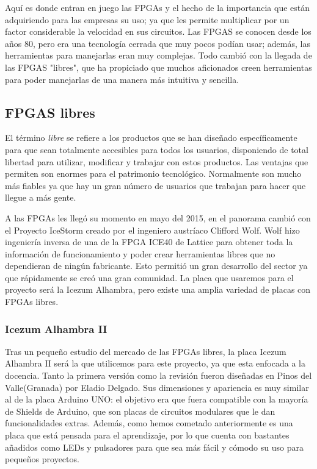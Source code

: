 Aquí es donde entran en juego las FPGAs y el hecho de la importancia que están adquiriendo para las empresas su uso; ya que les permite multiplicar por un factor considerable la velocidad en sus circuitos. Las FPGAS se conocen desde los años 80, pero era una tecnología cerrada que muy pocos podían usar; además, las herramientas para manejarlas eran muy complejas. Todo cambió con la llegada de las FPGAS "libres", que ha propiciado que muchos aficionados creen herramientas para poder manejarlas de una manera más intuitiva y sencilla. \newline

\subsection{FPGAS libres}

El término \textit{libre} se refiere a los productos que se han diseñado específicamente para que sean totalmente accesibles para todos los usuarios, disponiendo de total libertad para utilizar, modificar y trabajar con estos productos. 
Las ventajas que permiten son enormes para el patrimonio tecnológico. Normalmente son mucho más fiables ya que hay un gran número de usuarios que trabajan para hacer que llegue a más gente. \newline

A las FPGAs les llegó su momento en mayo del 2015, en el panorama cambió con el Proyecto IceStorm creado por el ingeniero austríaco Clifford Wolf. \newline Wolf hizo ingeniería inversa de una de la FPGA ICE40 de Lattice para obtener toda la información de funcionamiento y poder crear herramientas libres que no dependieran de ningún fabricante. Esto permitió un gran desarrollo del sector ya que rápidamente se creó una gran comunidad.
La placa que usaremos para el proyecto será la Icezum Alhambra, pero existe una amplia variedad de placas con FPGAs libres.

\subsubsection{Icezum Alhambra II}

Tras un pequeño estudio del mercado de las FPGAs libres, la placa Icezum Alhambra II será la que utilicemos para este proyecto, ya que esta enfocada a la docencia. Tanto la primera versión como la revisión fueron diseñadas en Pinos del Valle(Granada) por Eladio Delgado. Sus dimensiones y apariencia es muy similar al de la placa Arduino UNO: el objetivo era que fuera compatible con la mayoría de Shields de Arduino, que son placas de circuitos modulares que le dan funcionalidades extras. Además, como hemos cometado anteriormente es una placa que está pensada para el aprendizaje, por lo que cuenta con bastantes añadidos como LEDs y pulsadores para que sea más fácil y cómodo su uso para pequeños proyectos.

